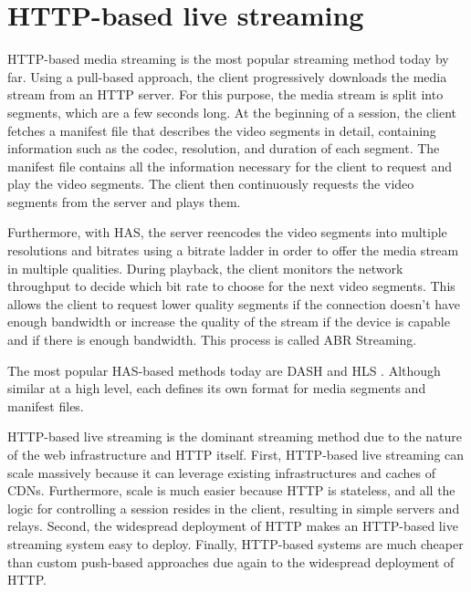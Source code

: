 \section{HTTP-based live streaming}
HTTP-based media streaming is the most popular streaming method today by far. Using a pull-based approach, the client progressively downloads the media stream from an HTTP server. For this purpose, the media stream is split into segments, which are a few seconds long. At the beginning of a session, the client fetches a manifest file that describes the video segments in detail, containing information such as the codec, resolution, and duration of each segment. The manifest file contains all the information necessary for the client to request and play the video segments. The client then continuously requests the video segments from the server and plays them.

Furthermore, with \acf{HAS}, the server reencodes the video segments into multiple resolutions and bitrates using a bitrate ladder in order to offer the media stream in multiple qualities. During playback, the client monitors the network throughput to decide which bit rate to choose for the next video segments. This allows the client to request lower quality segments if the connection doesn't have enough bandwidth or increase the quality of the stream if the device is capable and if there is enough bandwidth. This process is called \ac{ABR} Streaming.

The most popular \ac{HAS}-based methods today are \ac{DASH} \parencite{DASH} and \ac{HLS} \parencite{incHTTPLiveStreaming}. Although similar at a high level, each defines its own format for media segments and manifest files.

HTTP-based live streaming is the dominant streaming method due to the nature of the web infrastructure and HTTP itself. First, HTTP-based live streaming can scale massively because it can leverage existing infrastructures and caches of \acp{CDN}. Furthermore, scale is much easier because HTTP is stateless, and all the logic for controlling a session resides in the client, resulting in simple servers and relays. Second, the widespread deployment of HTTP makes an HTTP-based live streaming system easy to deploy. Finally, HTTP-based systems are much cheaper than custom push-based approaches due again to the widespread deployment of HTTP.


